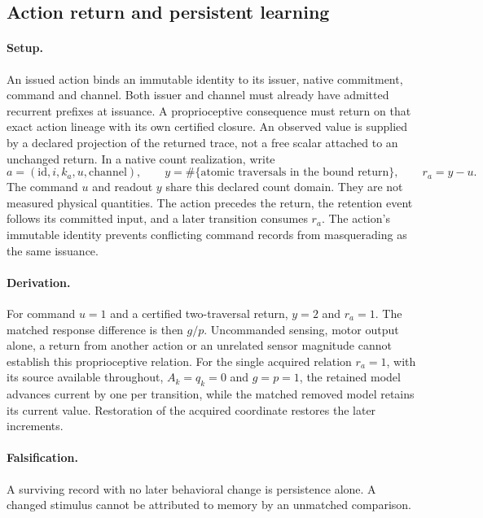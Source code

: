 \subsection{Action return and persistent learning}
\label{subsec:proprioception-learning}
\paragraph{Setup.}
An issued action binds an immutable identity to its issuer, native commitment,
command and channel. Both issuer and channel must already have admitted
recurrent prefixes at issuance. A proprioceptive consequence must return on that exact
action lineage with its own certified closure. An observed value is supplied
by a declared projection of the returned trace, not a free scalar attached
to an unchanged return. In a native count realization, write
\begin{equation}
 a=(\mathrm{id},i,k_a,u,\mathrm{channel}),\qquad
 y=\#\{\text{atomic traversals in the bound return}\},\qquad r_a=y-u.
 \label{eq:action-return-retention}
\end{equation}
The command \(u\) and readout \(y\) share this declared count domain. They are
not measured physical quantities. The action precedes the return, the
retention event follows its committed input, and a later transition consumes
\(r_a\). The action's immutable identity prevents conflicting command records
from masquerading as the same issuance.

\paragraph{Derivation.}
For command \(u=1\) and a certified two-traversal return, \(y=2\) and
\(r_a=1\). The matched response difference is then \(g/p\).
Uncommanded sensing, motor output alone, a return from another action or an
unrelated sensor magnitude cannot establish this proprioceptive relation.
For the single acquired
relation \(r_a=1\), with its source available throughout, \(A_k=q_k=0\) and
\(g=p=1\), the retained model advances current by one per transition, while
the matched removed model retains its current value.
Restoration of the acquired coordinate restores the later increments.

\paragraph{Falsification.}
A surviving record with no later behavioral change is persistence alone.
A changed stimulus cannot be attributed to memory by an unmatched comparison.

